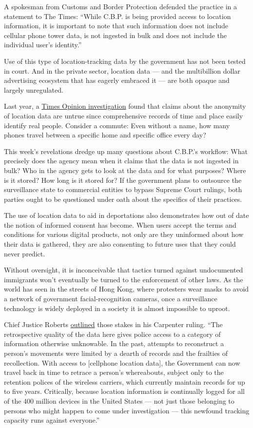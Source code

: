 A spokesman from Customs and Border Protection defended the practice in
a statement to The Times: ``While C.B.P. is being provided access to
location information, it is important to note that such information does
not include cellular phone tower data, is not ingested in bulk and does
not include the individual user's identity.''

Use of this type of location-tracking data by the government has not
been tested in court. And in the private sector, location data --- and
the multibillion dollar advertising ecosystem that has eagerly embraced
it --- are both opaque and largely unregulated.

Last year, a
\href{https://www.nytimes.com/interactive/2019/12/19/opinion/location-tracking-cell-phone.html}{Times
Opinion investigation} found that claims about the anonymity of location
data are untrue since comprehensive records of time and place easily
identify real people. Consider a commute: Even without a name, how many
phones travel between a specific home and specific office every day?

This week's revelations dredge up many questions about C.B.P.'s
workflow: What precisely does the agency mean when it claims that the
data is not ingested in bulk? Who in the agency gets to look at the data
and for what purposes? Where is it stored? How long is it stored for? If
the government plans to outsource the surveillance state to commercial
entities to bypass Supreme Court rulings, both parties ought to be
questioned under oath about the specifics of their practices.

The use of location data to aid in deportations also demonstrates how
out of date the notion of informed consent has become. When users accept
the terms and conditions for various digital products, not only are they
uninformed about how their data is gathered, they are also consenting to
future uses that they could never predict.

Without oversight, it is inconceivable that tactics turned against
undocumented immigrants won't eventually be turned to the enforcement of
other laws. As the world has seen in the streets of Hong Kong, where
protesters wear masks to avoid a network of government
facial-recognition cameras, once a surveillance technology is widely
deployed in a society it is almost impossible to uproot.

Chief Justice Roberts
\href{https://www.supremecourt.gov/opinions/17pdf/16-402_h315.pdf}{outlined}
those stakes in his Carpenter ruling. ``The retrospective quality of the
data here gives police access to a category of information otherwise
unknowable. In the past, attempts to reconstruct a person's movements
were limited by a dearth of records and the frailties of recollection.
With access to {[}cellphone location data{]}, the Government can now
travel back in time to retrace a person's whereabouts, subject only to
the retention polices of the wireless carriers, which currently maintain
records for up to five years. Critically, because location information
is continually logged for all of the 400 million devices in the United
States --- not just those belonging to persons who might happen to come
under investigation --- this newfound tracking capacity runs against
everyone.''

